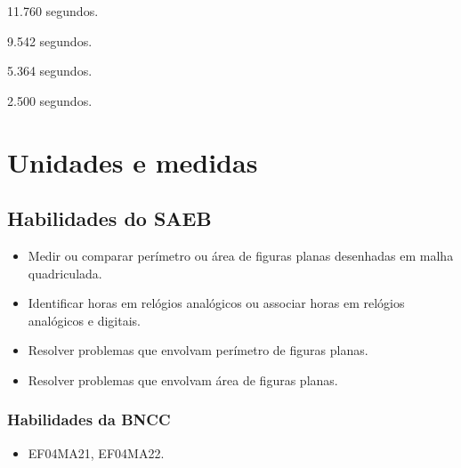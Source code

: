 \begin{multicols}{2}
\begin{escolha}
\item
  11.760 segundos.
\item
  9.542 segundos.
\item
  5.364 segundos.
\item
  2.500 segundos.
\end{escolha}
\end{multicols}

\chapter{Unidades e medidas}

\section*{Habilidades do SAEB}

\begin{itemize}
\item Medir ou comparar perímetro ou área de figuras planas desenhadas em
malha quadriculada.
\item Identificar horas em relógios analógicos ou associar horas em relógios
analógicos e digitais.
\item Resolver problemas que envolvam perímetro de figuras planas.
\item Resolver problemas que envolvam área de figuras planas.
\end{itemize}

\subsection{Habilidades da BNCC}

\begin{itemize}
\item EF04MA21, EF04MA22.
\end{itemize}

